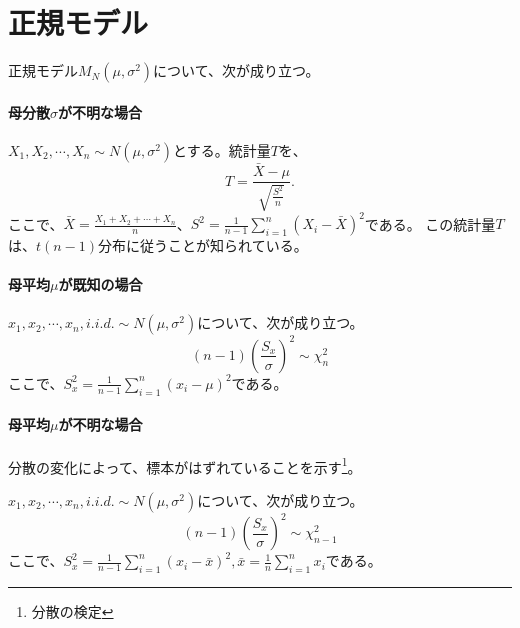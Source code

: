 \section{正規モデル}
正規モデル$M_N(\mu,\sigma^2)$について、次が成り立つ。
\paragraph{母分散$\sigma$が不明な場合}
$X_1,X_2,\cdots,X_n \sim N(\mu,\sigma^2)$とする。統計量$T$を、
\begin{equation*}
    T = \frac{\bar{X}-\mu}{\sqrt{\frac{S^2}{n}}}.
\end{equation*}
ここで、$\bar{X}=\frac{X_1+X_2+\cdots+X_n}{n}$、$S^2=\frac{1}{n-1}\sum_{i=1}^{n}(X_i-\bar{X})^2$である。
この統計量$T$は、$t(n-1)$分布に従うことが知られている。


\paragraph{母平均$\mu$が既知の場合}
\begin{theo}\label{normal_sigma_chi2}
    $x_1,x_2,\cdots,x_n,i.i.d. \sim N(\mu,\sigma^2)$について、次が成り立つ。
    \begin{equation*}
     (n-1)\left(\frac{S_x}{\sigma} \right)^2 \sim \chi^2_{n}
    \end{equation*}
    ここで、$S^2_x=\frac{1}{n-1}\sum_{i=1}^n(x_i-\mu)^2$である。
\end{theo}

\paragraph{母平均$\mu$が不明な場合}
分散の変化によって、標本がはずれていることを示す\footnote{分散の検定}。
\begin{theo}\label{normal_sigma_chi2}
    $x_1,x_2,\cdots,x_n,i.i.d. \sim N(\mu,\sigma^2)$について、次が成り立つ。
    \begin{equation*}
        (n-1)\left(\frac{S_x}{\sigma} \right)^2 \sim \chi^2_{n-1}
    \end{equation*}
    ここで、$S^2_x=\frac{1}{n-1}\sum_{i=1}^n(x_i-\bar{x})^2,\bar{x}=\frac{1}{n}\sum_{i=1}^n x_i$である。
\end{theo}


